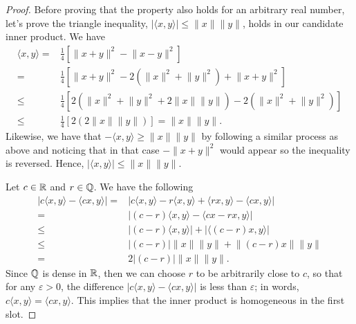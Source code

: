 \begin{proof}
    Before proving that the property also holds for an arbitrary real number, let's prove the triangle inequality, $\lvert\langle x,y\rangle\rvert\leq\lVert x\rVert\lVert y\rVert$, holds in our candidate inner product. We have
    \begin{align*}
        \langle x,y\rangle =&  \frac{1}{4}[\lVert x+y\rVert^2-\lVert x-y\rVert^2]\\
        =& \frac{1}{4}[\lVert x+y\rVert^2-2(\lVert x\rVert^2+\lVert y\rVert^2)+\lVert x+y\rVert^2]\\
        \leq& \frac{1}{4}[2(\lVert x\rVert^2 +\lVert y\rVert^2 +2\lVert x\rVert\lVert y\rVert)-2(\lVert x\rVert^2+\lVert y\rVert^2)]\\
        \leq& \frac{1}{4}[2(2\lVert x\rVert\lVert y\rVert)]= \lVert x\rVert\lVert y\rVert.
    \end{align*}
    Likewise, we have that $-\langle x,y\rangle\geq\lVert x\rVert\lVert y\rVert$ by following a similar process as above and noticing that in that case $-\lVert x+y\rVert^2$ would appear so the inequality is reversed. Hence, $\lvert\langle x,y\rangle\rvert\leq\lVert x\rVert\lVert y\rVert$.
    
    Let $c\in\mathbb{R}$ and $r\in\mathbb{Q}$. We have the following
    \begin{align*}
        \lvert c\langle x,y\rangle - \langle cx,y\rangle\rvert =& \lvert c\langle x,y\rangle -r\langle x,y\rangle +\langle rx,y\rangle -\langle cx,y\rangle\rvert\\
        =& \lvert (c-r)\langle x,y\rangle -\langle cx -rx,y\rangle\rvert\\
        \leq& \lvert (c-r)\langle x,y\rangle\rvert +\lvert\langle (c-r)x,y\rangle\rvert\\
        \leq& \lvert (c-r)\rvert\lVert x\rVert\lVert y\rVert +\lVert (c-r)x\rVert\lVert y\rVert\\
        =& 2\lvert (c-r)\rvert\lVert x\rVert\lVert y\rVert.
    \end{align*}
    Since $\mathbb{Q}$ is dense in $\mathbb{R}$, then we can choose $r$ to be arbitrarily close to $c$, so that for any $\varepsilon >0$, the difference $\lvert c\langle x,y\rangle - \langle cx,y\rangle\rvert$ is less than $\varepsilon$; in words, $c\langle x,y\rangle= \langle cx,y\rangle$. This implies that the inner product is homogeneous in the first slot.
    

\end{proof}
